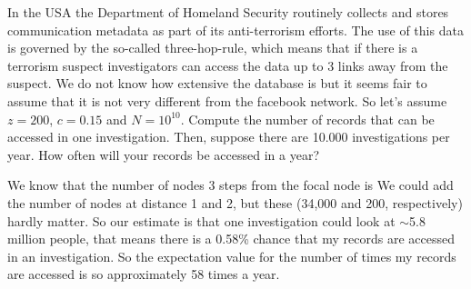 
In the USA the Department of Homeland Security routinely collects and stores communication metadata as part of its anti-terrorism efforts. The use of this data is governed by the so-called three-hop-rule, which means that if there is a terrorism suspect investigators can access the data up to 3 links away from the suspect. We do not know how extensive the database is but it seems fair to assume that it is not very different from the facebook network. So let's assume $z=200$, $c=0.15$ and $N=10^{10}$. Compute the number of records that can be accessed in one investigation. Then, suppose there are 10.000 investigations per year. How often will your records be accessed in a year?

\solution
We know that the number of nodes 3 steps from the focal node is 
We could add the number of nodes at distance 1 and 2, but these 
(34,000 and 200, respectively) hardly matter. So our estimate is that one investigation could look at $\sim$5.8 million people, that means there is a 0.58\% chance that my records are accessed in an investigation. So the expectation value for the number of times my records are accessed is 
so approximately 58 times a year. 
